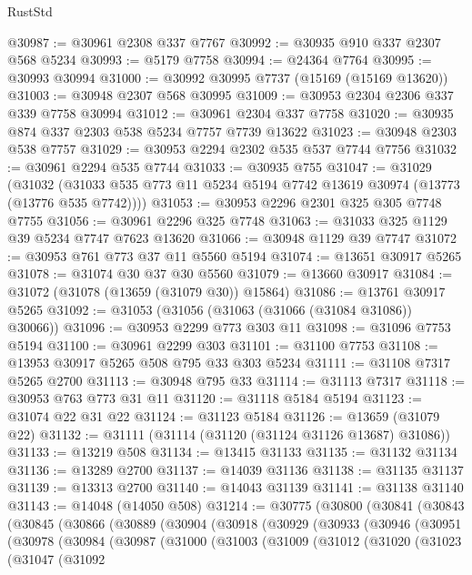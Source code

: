 \begin{lexlean}{RustStd}
\begin{coremodule}
@30987 := @30961 @2308 @337 @7767
@30992 := @30935 @910 @337 @2307 @568 @5234
@30993 := @5179 @7758
@30994 := @24364 @7764
@30995 := @30993 @30994
@31000 := @30992 @30995 @7737 (@15169 (@15169 @13620))
@31003 := @30948 @2307 @568 @30995
@31009 := @30953 @2304 @2306 @337 @339 @7758 @30994
@31012 := @30961 @2304 @337 @7758
@31020 := @30935 @874 @337 @2303 @538 @5234 @7757 @7739 @13622
@31023 := @30948 @2303 @538 @7757
@31029 := @30953 @2294 @2302 @535 @537 @7744 @7756
@31032 := @30961 @2294 @535 @7744
@31033 := @30935 @755
@31047 := @31029
    (@31032 (@31033 @535 @773 @11 @5234 @5194 @7742 @13619 @30974 (@13773 (@13776 @535 @7742))))
@31053 := @30953 @2296 @2301 @325 @305 @7748 @7755
@31056 := @30961 @2296 @325 @7748
@31063 := @31033 @325 @1129 @39 @5234 @7747 @7623 @13620
@31066 := @30948 @1129 @39 @7747
@31072 := @30953 @761 @773 @37 @11 @5560 @5194
@31074 := @13651 @30917 @5265
@31078 := @31074 @30 @37 @30 @5560
@31079 := @13660 @30917
@31084 := @31072 (@31078 (@13659 (@31079 @30)) @15864)
@31086 := @13761 @30917 @5265
@31092 := @31053 (@31056 (@31063 (@31066 (@31084 @31086)) @30066))
@31096 := @30953 @2299 @773 @303 @11
@31098 := @31096 @7753 @5194
@31100 := @30961 @2299 @303
@31101 := @31100 @7753
@31108 := @13953 @30917 @5265 @508 @795 @33 @303 @5234
@31111 := @31108 @7317 @5265 @2700
@31113 := @30948 @795 @33
@31114 := @31113 @7317
@31118 := @30953 @763 @773 @31 @11
@31120 := @31118 @5184 @5194
@31123 := @31074 @22 @31 @22
@31124 := @31123 @5184
@31126 := @13659 (@31079 @22)
@31132 := @31111 (@31114 (@31120 (@31124 @31126 @13687) @31086))
@31133 := @13219 @508
@31134 := @13415 @31133
@31135 := @31132 @31134
@31136 := @13289 @2700
@31137 := @14039 @31136
@31138 := @31135 @31137
@31139 := @13313 @2700
@31140 := @14043 @31139
@31141 := @31138 @31140
@31143 := @14048 (@14050 @508)
@31214 := @30775
    (@30800
      (@30841
        (@30843
          (@30845
            (@30866
              (@30889
                (@30904
                  (@30918
                    (@30929
                      (@30933
                        (@30946
                          (@30951
                            (@30978
                              (@30984
                                (@30987
                                  (@31000
                                    (@31003
                                      (@31009
                                        (@31012
                                          (@31020
                                            (@31023
                                              (@31047
                                                (@31092

\end{coremodule}
\end{lexlean}
